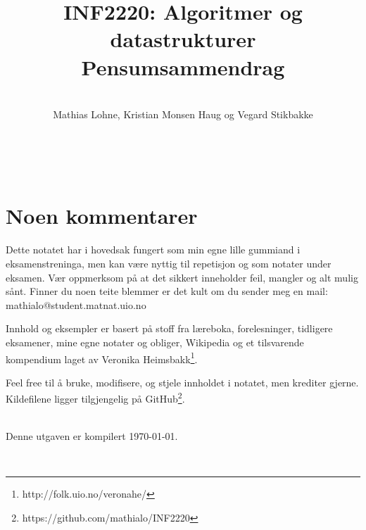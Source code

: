\documentclass[10pt, norsk, a4paper, sans, hidelinks, twoside]{article}
\title{\titlefontthin INF2220: Algoritmer og datastrukturer \\ Pensumsammendrag}
\author{\vspace{30pt}\\\titlefontthin Mathias Lohne, Kristian Monsen Haug og Vegard Stikbakke}
\date{}
\newcommand{\mono}[1]{{\monofont \small #1}}
\numberwithin{myTheo}{subsection}
\begin{document}
\maketitle
\thispagestyle{empty}
\newpage
\thispagestyle{empty}
~\newpage
{}
\thispagestyle{plain}

\section*{Noen kommentarer}
Dette notatet har i hovedsak fungert som min egne lille gummiand i eksamenstreninga, men kan være nyttig til repetisjon og som notater under eksamen. Vær oppmerksom på at det sikkert inneholder feil, mangler og alt mulig sånt. Finner du noen teite blemmer er det kult om du sender meg en mail: \mono{mathialo@student.matnat.uio.no}

Innhold og eksempler er basert på stoff fra læreboka, forelesninger, tidligere eksamener, mine egne notater og obliger, Wikipedia og et tilsvarende kompendium laget av Veronika Heimsbakk\footnote{http://folk.uio.no/veronahe/}.

Feel free til å bruke, modifisere, og stjele innholdet i notatet, men krediter gjerne. Kildefilene ligger tilgjengelig på GitHub\footnote{https://github.com/mathialo/INF2220}.

~\\Denne utgaven er kompilert \today.

~\\

\newpage
\thispagestyle{plain}



\tableofcontents
\thispagestyle{plain}
\newpage
{}


\newpage

\newpage

\newpage

\newpage

\newpage

\newpage

\newpage

\newpage
\appendix

\end{document}
